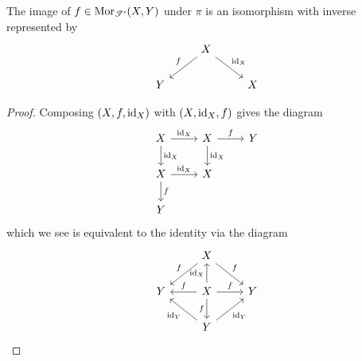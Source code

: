 \documentclass[dissertation.tex]{subfiles}
\begin{document}
\begin{lem}
  The image of $f \in \operatorname{Mor}_{\mathscr{T}^\prime}(X,Y)$ under $\pi$ is an isomorphism with inverse represented by
  $$\begin{tikzcd}
    & X \arrow[swap]{ld}{f}\arrow{rd}{\id_X}\\
    Y & & X
  \end{tikzcd}$$

  \begin{proof}
    Composing $(X,f,\operatorname{id}_X)$ with $(X,\operatorname{id}_X,f)$ gives the diagram
    $$\begin{tikzcd}
      X \arrow{r}{\id_X}\arrow{d}{\id_X} & X\arrow{d}{\id_X}\arrow{r}{f} & Y\\
      X \arrow{r}{\id_X}\arrow{d}{f} & X\\
      Y
    \end{tikzcd}$$
    which we see is equivalent to the identity via the diagram
    $$\begin{tikzcd}
       & X \arrow[swap]{ld}{f}\arrow{rd}{f}\\
      Y & X\arrow[swap]{l}{f}\arrow{r}{f}\arrow{u}{\id_X}\arrow[swap]{d}{f} & Y\\
      & Y\arrow{ul}{\id_Y}\arrow[swap]{ur}{\id_Y}
    \end{tikzcd}$$


\end{proof}
\end{lem}
\end{document}

